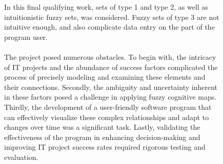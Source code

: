 \documentclass{article}
\begin{document}
    \begin{figure}[!t]
        \fontsize{8}{7}\selectfont
        \begin{minipage}{0.49\textwidth}
            In this final qualifying work, sets of type 1 and type 2, as well as intuitionistic fuzzy sets, was considered. Fuzzy sets of type 3 are not intuitive enough, and also complicate data entry on the part of the program user.\\
            ~\\
            The project posed numerous obstacles. To begin with, the intricacy of IT projects and the abundance of success factors complicated the process of precisely modeling and examining these elements and their connections. Secondly, the ambiguity and uncertainty inherent in these factors posed a challenge in applying fuzzy cognitive maps. Thirdly, the development of a user-friendly software program that can effectively visualize these complex relationships and adapt to changes over time was a significant task. Lastly, validating the effectiveness of the program in enhancing decision-making and improving IT project success rates required rigorous testing and evaluation.\\
            \begin{center}

\end{center}
\end{minipage}
\end{figure}
\end{document}
